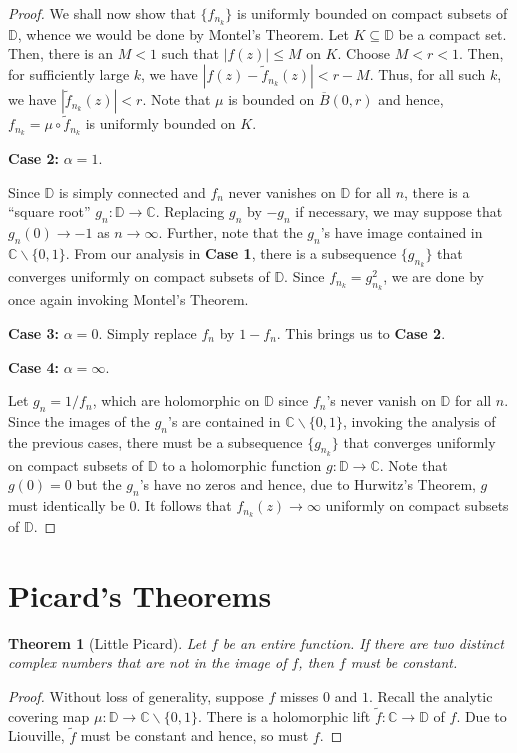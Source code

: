\documentclass[12pt]{article}
\theoremstyle{thmstyle}
\newtheorem{theorem}{Theorem}[section]
\theoremstyle{defstyle}
\newcommand{\bbC}{\mathbb{C}}
\newcommand{\wt}[1]{\widetilde{#1}}
\renewcommand{\le}{\leqslant}
\newcommand{\bbD}{\mathbb{D}}
\begin{document}
\begin{proof}
    We shall now show that $\{f_{n_k}\}$ is uniformly bounded on compact subsets of $\bbD$, whence we would be done by Montel's Theorem. Let $K\subseteq\bbD$ be a compact set. Then, there is an $M < 1$ such that $|f(z)|\le M$ on $K$. Choose $M < r < 1$. Then, for sufficiently large $k$, we have $|f(z) - \wt f_{n_k}(z)| < r - M$. Thus, for all such $k$, we have $|\wt f_{n_k}(z)| < r$. Note that $\mu$ is bounded on $\overline B(0, r)$ and hence, $f_{n_k} = \mu\circ\wt f_{n_k}$ is uniformly bounded on $K$.

    \textbf{Case 2:} $\alpha = 1$.

    Since $\bbD$ is simply connected and $f_n$ never vanishes on $\bbD$ for all $n$, there is a ``square root'' $g_n: \bbD\to\bbC$. Replacing $g_n$ by $-g_n$ if necessary, we may suppose that $g_n(0)\to -1$ as $n\to\infty$. Further, note that the $g_n$'s have image contained in $\bbC\backslash\{0,1\}$. From our analysis in \textbf{Case 1}, there is a subsequence $\{g_{n_k}\}$ that converges uniformly on compact subsets of $\bbD$. Since $f_{n_k} = g_{n_k}^2$, we are done by once again invoking Montel's Theorem.

    \textbf{Case 3:} $\alpha = 0$.
    Simply replace $f_n$ by $1 - f_n$. This brings us to \textbf{Case 2}.

    \textbf{Case 4:} $\alpha = \infty$.

    Let $g_n = 1/f_n$, which are holomorphic on $\bbD$ since $f_n$'s never vanish on $\bbD$ for all $n$. Since the images of the $g_n$'s are contained in $\bbC\backslash\{0,1\}$, invoking the analysis of the previous cases, there must be a subsequence $\{g_{n_k}\}$ that converges uniformly on compact subsets of $\bbD$ to a holomorphic function $g:\bbD\to\bbC$. Note that $g(0) = 0$ but the $g_n$'s have no zeros and hence, due to Hurwitz's Theorem, $g$ must identically be $0$. It follows that $f_{n_k}(z)\to\infty$ uniformly on compact subsets of $\bbD$.
\end{proof}

\section{Picard's Theorems}

\begin{theorem}[Little Picard]
    Let $f$ be an entire function. If there are two distinct complex numbers that are not in the image of $f$, then $f$ must be constant.
\end{theorem}
\begin{proof}
    Without loss of generality, suppose $f$ misses $0$ and $1$. Recall the analytic covering map $\mu:\bbD\to\bbC\backslash\{0,1\}$. There is a holomorphic lift $\wt f: \bbC\to\bbD$ of $f$. Due to Liouville, $\wt f$ must be constant and hence, so must $f$.
\end{proof}
\end{document}

